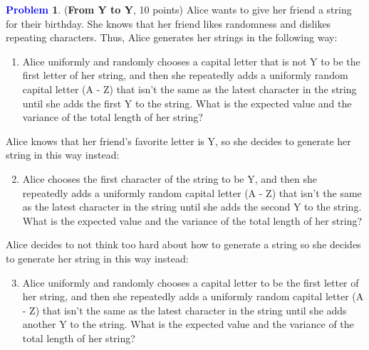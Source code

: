 \documentclass[letterpaper,11pt]{article}
\theoremstyle{plain}%
\theoremstyle{definition}
\newtheorem{problem}{\textcolor{blue}{Problem}}
\theoremstyle{plain}%
\begin{document}
\begin{problem} (\textbf{From Y to Y}, 10 points)  Alice wants to give her friend a string for their birthday. She knows that her friend likes randomness and dislikes repeating characters. Thus, Alice generates her strings in the following way:
    \begin{enumerate}[label=(\alph*)]
        \item Alice uniformly and randomly chooses a capital letter that is not Y to be the first letter of her string, and then she repeatedly adds a uniformly random capital letter (A - Z) that isn't the same as the latest character in the string until she adds the first Y to the string. What is the expected value and the variance of the total length of her string?
    \end{enumerate}

    Alice knows that her friend's favorite letter is Y, so she decides to generate her string in this way instead:
    \begin{enumerate}[label=(\alph*)]\setcounter{enumi}{1}
        \item Alice chooses the first character of the string to be Y, and then she repeatedly adds a uniformly random capital letter (A - Z) that isn't the same as the latest character in the string until she adds the second Y to the string. What is the expected value and the variance of the total length of her string?
    \end{enumerate}

    Alice decides to not think too hard about how to generate a string so she decides to generate her string in this way instead:
    \begin{enumerate}[label=(\alph*)]\setcounter{enumi}{2}
        \item Alice uniformly and randomly chooses a capital letter to be the first letter of her string, and then she repeatedly adds a uniformly random capital letter (A - Z) that isn't the same as the latest character in the string until she adds another Y to the string. What is the expected value and the variance of the total length of her string?
    \end{enumerate}
\end{problem}
\end{document}
